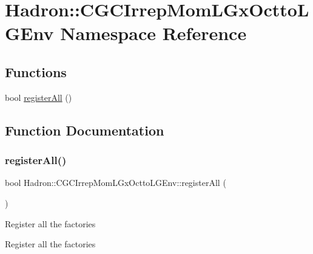 \hypertarget{namespaceHadron_1_1CGCIrrepMomLGxOcttoLGEnv}{}\section{Hadron\+:\+:C\+G\+C\+Irrep\+Mom\+L\+Gx\+Octto\+L\+G\+Env Namespace Reference}
\label{namespaceHadron_1_1CGCIrrepMomLGxOcttoLGEnv}
\subsection*{Functions}
\begin{DoxyCompactItemize}
\item 
bool \mbox{\hyperlink{namespaceHadron_1_1CGCIrrepMomLGxOcttoLGEnv_a8e2a60d80852181dcdfbcef290164852}{register\+All}} ()
\end{DoxyCompactItemize}


\subsection{Function Documentation}
\mbox{\label{namespaceHadron_1_1CGCIrrepMomLGxOcttoLGEnv_a8e2a60d80852181dcdfbcef290164852}} 
\subsubsection{\texorpdfstring{registerAll()}{registerAll()}}
{\footnotesize\ttfamily bool Hadron\+::\+C\+G\+C\+Irrep\+Mom\+L\+Gx\+Octto\+L\+G\+Env\+::register\+All (\begin{DoxyParamCaption}{ }\end{DoxyParamCaption})}

Register all the factories

Register all the factories

